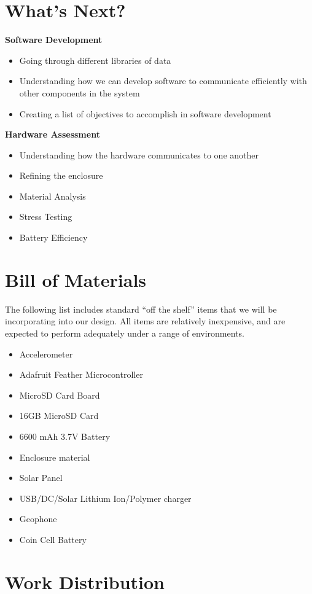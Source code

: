 \documentclass[12pt]{article}
\begin{document}
\section{What's Next?}
\textbf{Software Development}
\begin{itemize}
\item Going through different libraries of data
\item Understanding how we can develop software to communicate efficiently with other components in the system
\item Creating a list of objectives to accomplish in software development
\end{itemize}

\noindent \textbf{Hardware Assessment}
\begin{itemize}
\item Understanding how the hardware communicates to one another
\item Refining the enclosure
\item Material Analysis
\item Stress Testing
\item Battery Efficiency
\end{itemize}

\section{Bill of Materials}
The following list includes standard ``off the shelf'' items that we will be incorporating into our design. All items are relatively inexpensive, and are expected to perform adequately under a range of environments.

\begin{itemize}
\item Accelerometer
\item Adafruit Feather Microcontroller
\item MicroSD Card Board
\item 16GB MicroSD Card
\item 6600 mAh 3.7V Battery
\item Enclosure material
\item Solar Panel
\item USB/DC/Solar Lithium Ion/Polymer charger
\item Geophone
\item Coin Cell Battery
\end{itemize}

\section{Work Distribution}
\end{document}
